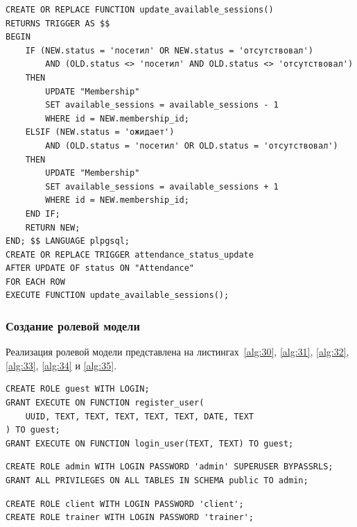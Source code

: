 \begin{lstlisting}[label=alg:27, caption=Реализация триггера для автоматического обновления количества доступных занятий после посещения тренировки, captionpos=t]
CREATE OR REPLACE FUNCTION update_available_sessions()
RETURNS TRIGGER AS $$
BEGIN
	IF (NEW.status = 'посетил' OR NEW.status = 'отсутствовал') 
		AND (OLD.status <> 'посетил' AND OLD.status <> 'отсутствовал') 
	THEN
		UPDATE "Membership"
		SET available_sessions = available_sessions - 1
		WHERE id = NEW.membership_id;
	ELSIF (NEW.status = 'ожидает') 
		AND (OLD.status = 'посетил' OR OLD.status = 'отсутствовал') 
	THEN
		UPDATE "Membership"
		SET available_sessions = available_sessions + 1
		WHERE id = NEW.membership_id;
	END IF;
	RETURN NEW;
END; $$ LANGUAGE plpgsql;
CREATE OR REPLACE TRIGGER attendance_status_update
AFTER UPDATE OF status ON "Attendance"
FOR EACH ROW
EXECUTE FUNCTION update_available_sessions();
\end{lstlisting}

\subsubsection{Создание ролевой модели}

Реализация ролевой модели представлена на листингах~\ref{alg:30}, \ref{alg:31}, \ref{alg:32}, \ref{alg:33}, \ref{alg:34} и \ref{alg:35}.

\begin{lstlisting}[label=alg:30, caption=Реализация роли Guest (гость), captionpos=t]
CREATE ROLE guest WITH LOGIN;
GRANT EXECUTE ON FUNCTION register_user(
	UUID, TEXT, TEXT, TEXT, TEXT, TEXT, DATE, TEXT
) TO guest;
GRANT EXECUTE ON FUNCTION login_user(TEXT, TEXT) TO guest;
\end{lstlisting}

\begin{lstlisting}[label=alg:31, caption=Реализация роли Admin (администратор), captionpos=t]
CREATE ROLE admin WITH LOGIN PASSWORD 'admin' SUPERUSER BYPASSRLS;
GRANT ALL PRIVILEGES ON ALL TABLES IN SCHEMA public TO admin;
\end{lstlisting}

\begin{lstlisting}[label=alg:32, caption=Реализация ролей Client (клиент) и Trainer (тренер) -- начало, captionpos=t]
CREATE ROLE client WITH LOGIN PASSWORD 'client';
CREATE ROLE trainer WITH LOGIN PASSWORD 'trainer';
\end{lstlisting}

